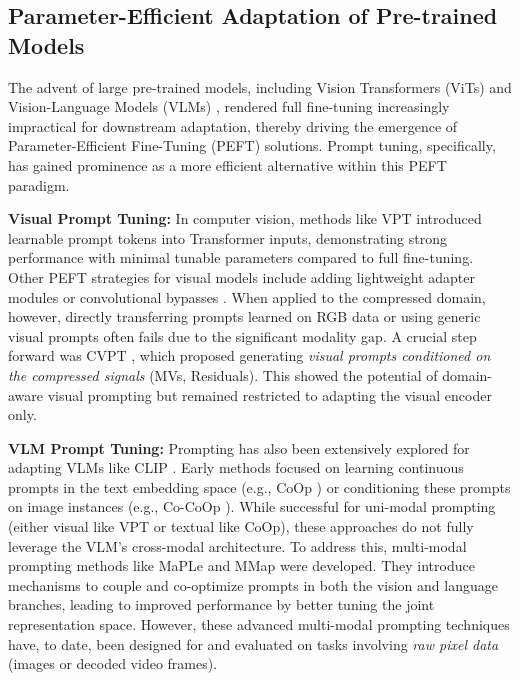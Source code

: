 \documentclass[runningheads]{llncs}
\begin{document}
\subsection{Parameter-Efficient Adaptation of Pre-trained Models}
\label{subsec:peft_adaptation}

The advent of large pre-trained models, including Vision Transformers (ViTs) and Vision-Language Models (VLMs) \cite{radford2021learning,yuan2021florence}, rendered full fine-tuning increasingly impractical for downstream adaptation, thereby driving the emergence of Parameter-Efficient Fine-Tuning (PEFT) solutions. Prompt tuning, specifically, has gained prominence as a more efficient alternative within this PEFT paradigm.

\textbf{Visual Prompt Tuning:} In computer vision, methods like VPT \cite{jia2022visual} introduced learnable prompt tokens into Transformer inputs, demonstrating strong performance with minimal tunable parameters compared to full fine-tuning. Other PEFT strategies for visual models include adding lightweight adapter modules \cite{chen2022adaptformer} or convolutional bypasses \cite{jie2024convolutional}. When applied to the compressed domain, however, directly transferring prompts learned on RGB data or using generic visual prompts often fails due to the significant modality gap. A crucial step forward was CVPT \cite{li2023compressed}, which proposed generating \textit{visual prompts conditioned on the compressed signals} (MVs, Residuals). This showed the potential of domain-aware visual prompting but remained restricted to adapting the visual encoder only.

\textbf{VLM Prompt Tuning:} Prompting has also been extensively explored for adapting VLMs like CLIP \cite{radford2021learning}. Early methods focused on learning continuous prompts in the text embedding space (e.g., CoOp \cite{zhou2022learning}) or conditioning these prompts on image instances (e.g., Co-CoOp \cite{zhou2022conditional}). While successful for uni-modal prompting (either visual like VPT or textual like CoOp), these approaches do not fully leverage the VLM's cross-modal architecture. To address this, multi-modal prompting methods like MaPLe \cite{khattak2023maple} and MMap \cite{xin2024mmap} were developed. They introduce mechanisms to couple and co-optimize prompts in both the vision and language branches, leading to improved performance by better tuning the joint representation space. However, these advanced multi-modal prompting techniques have, to date, been designed for and evaluated on tasks involving \textit{raw pixel data} (images or decoded video frames).
\end{document}
